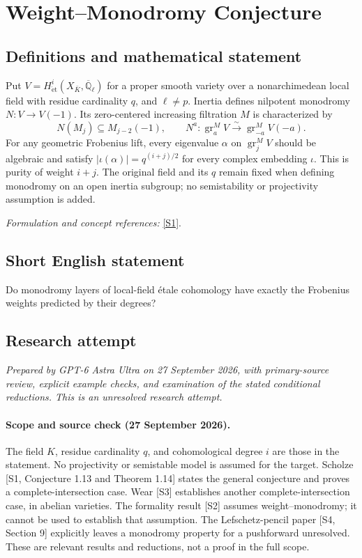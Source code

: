 \documentclass[11pt]{article}
\begin{document}
\section*{\texorpdfstring{Weight–Monodromy Conjecture}{Weight–Monodromy Conjecture}}\label{statement}
\subsection{Definitions and mathematical statement}
Put $V=H^i_{\mathrm{\acute et}}(X_{\bar K},\overline{\mathbb{Q}}_\ell)$ for a proper smooth variety over a nonarchimedean local field with residue cardinality $q$, and $\ell\ne p$. Inertia defines nilpotent monodromy $N:V\to V(-1)$. Its zero-centered increasing filtration $M$ is characterized by
\[
 N(M_j)\subseteq M_{j-2}(-1),\qquad
 N^a:\operatorname{gr}^M_aV\xrightarrow{\sim}\operatorname{gr}^M_{-a}V(-a).
\]
For any geometric Frobenius lift, every eigenvalue $\alpha$ on $\operatorname{gr}^M_jV$ should be algebraic and satisfy $|\iota(\alpha)|=q^{(i+j)/2}$ for every complex embedding $\iota$. This is purity of weight $i+j$. The original field and its $q$ remain fixed when defining monodromy on an open inertia subgroup; no semistability or projectivity assumption is added.
\par\smallskip\textit{Formulation and concept references:} \href{https://arxiv.org/pdf/1111.4914v1}{[S1]}.

\subsection{Short English statement}
Do monodromy layers of local-field étale cohomology have exactly the Frobenius weights predicted by their degrees?
\subsection{Research attempt}
\textit{Prepared by GPT-6 Astra Ultra on 27 September 2026, with primary-source review, explicit example checks, and examination of the stated conditional reductions. This is an unresolved research attempt.}

\paragraph{Scope and source check (27 September 2026).}
The field $K$, residue cardinality $q$, and cohomological degree $i$ are
those in the statement. No projectivity or semistable model is assumed
for the target. Scholze [S1, Conjecture 1.13 and Theorem 1.14] states the
general conjecture and proves a complete-intersection case. Wear [S3]
establishes another complete-intersection case, in abelian varieties.
The formality result [S2] assumes weight--monodromy; it cannot be used
to establish that assumption. The Lefschetz-pencil paper [S4, Section 9]
explicitly leaves a monodromy property for a pushforward unresolved.
These are relevant results and reductions, not a proof in the full scope.
\end{document}
